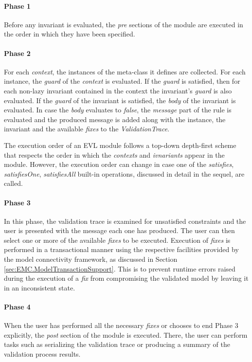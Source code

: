 \paragraph{Phase 1} Before any invariant is evaluated, the \emph{pre} sections of the module are executed in the order in which they have been specified.

\paragraph {Phase 2} For each \emph{context}, the instances of the meta-class it defines are collected. For each instance, the \emph{guard} of the \emph{context} is evaluated. If the \emph{guard} is satisfied, then for each non-lazy invariant contained in the context the invariant's \emph{guard} is also evaluated. If the \emph{guard} of the invariant is satisfied, the \emph{body} of the invariant is evaluated. In case the \emph{body} evaluates to \emph{false}, the \emph{message} part of the rule is evaluated and the produced message is added along with the instance, the invariant and the available \emph{fixes} to the \emph{ValidationTrace}. 

The execution order of an EVL module follows a top-down depth-first scheme that respects the order in which the \emph{contexts} and \emph{ivnariants} appear in the module. However, the execution order can change in case one of the \emph{satisfies}, \emph{satisfiesOne}, \emph{satisfiesAll} built-in operations, discussed in detail in the sequel, are called.

\paragraph{Phase 3} In this phase, the validation trace is examined for unsatisfied constraints and the user is presented with the message each one has produced. The user can then select one or more of the available \emph{fixes} to be executed. Execution of \emph{fixes} is performed in a transactional manner using the respective facilities provided by the model connectivity framework, as discussed in Section \ref{sec:EMC.ModelTransactionSupport}. This is to prevent runtime errors raised during the execution of a \emph{fix} from compromising the validated model by leaving it in an inconsistent state.

\paragraph{Phase 4} When the user has performed all the necessary \emph{fixes} or chooses to end Phase 3 explicitly, the \emph{post} section of the module is executed. There, the user can perform tasks such as serializing the validation trace or producing a summary of the validation process results.

